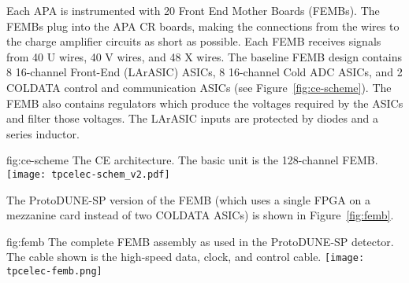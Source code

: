 
Each APA is instrumented with 20 Front End Mother Boards (FEMBs).
The FEMBs plug into the APA CR boards, making the connections from the wires to the charge amplifier circuits as short as possible.
Each FEMB receives signals from 40 U wires, 40 V wires, and 48 X wires.
The baseline FEMB design contains 8 16-channel Front-End (LArASIC) ASICs, 8 16-channel Cold ADC ASICs, and 2 COLDATA control and communication ASICs (see Figure~\ref{fig:ce-scheme}).
The FEMB also contains regulators which produce the voltages required by the ASICs and filter those voltages.
The LArASIC inputs are protected by diodes and a series inductor.
 
\begin{dunefigure}
{fig:ce-scheme}
{The CE architecture. The basic unit is the 128-channel FEMB.}
\texttt{[image: tpcelec-schem\_v2.pdf]}
\end{dunefigure}

The ProtoDUNE-SP version of the FEMB (which uses a single FPGA on a mezzanine card instead of two COLDATA ASICs) is shown in Figure~\ref{fig:femb}.

\begin{dunefigure}
{fig:femb}
{The complete FEMB assembly as used in the ProtoDUNE-SP detector. The cable shown is the high-speed data, clock, and control cable.}
\texttt{[image: tpcelec-femb.png]}
\end{dunefigure}
